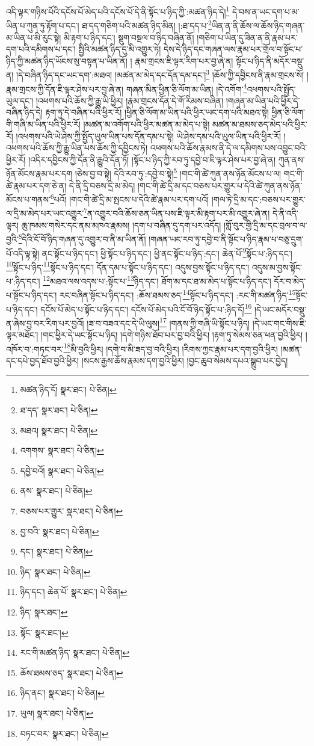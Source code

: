 འདི་ལྟར་གཉིས་པོའི་དངོས་པོ་མེད་པའི་དངོས་པོ་དེ་ནི་སྟོང་པ་ཉིད་ཀྱི་:མཚན་ཉིད་དེ།\footnote{མཚན་ཉིད་དོ།  སྣར་ཐང་།  པེ་ཅིན། } དེ་བས་ན་ཡང་དག་པ་མ་ཡིན་པ་ཀུན་ཏུ་རྟོག་པ་དང་། ཐ་དད་གཅིག་པའི་མཚན་ཉིད་མིན། །:ཐ་དད་པ་\footnote{ཐ་དད་  སྣར་ཐང་།  པེ་ཅིན། }ཡིན་ན་ནི་ཆོས་ལ་ཆོས་ཉིད་གཞན་མ་ཡིན་པ་མི་རུང་སྟེ། མི་རྟག་པ་ཉིད་དང་། སྡུག་བསྔལ་བ་ཉིད་བཞིན་ནོ། །གཅིག་པ་ཡིན་དུ་ཟིན་ན་ནི་རྣམ་པར་དག་པའི་དམིགས་པ་དང་། སྤྱིའི་མཚན་ཉིད་དུ་མི་འགྱུར་ཏེ། དེས་དེ་ཉིད་དང་གཞན་ལས་རྣམ་པར་གྲོལ་བ་སྟོང་པ་ཉིད་ཀྱི་མཚན་ཉིད་ཡོངས་སུ་བསྟན་པ་ཡིན་ནོ། །
རྣམ་གྲངས་ཇི་ལྟར་རིག་པར་བྱ་ཞེ་ན། སྟོང་པ་ཉིད་ནི་མདོར་བསྡུ་ན། །དེ་བཞིན་ཉིད་དང་ཡང་དག་:མཐའ། །མཚན་མ་མེད་དང་དོན་དམ་དང་།\footnote{མཐའ།  སྣར་ཐང་།  པེ་ཅིན། } །ཆོས་ཀྱི་དབྱིངས་ནི་རྣམ་གྲངས་སོ། །རྣམ་གྲངས་ཀྱི་དོན་ཇི་ལྟར་ཤེས་པར་བྱ་ཞེ་ན། གཞན་མིན་ཕྱིན་ཅི་ལོག་མ་ཡིན། །དེ་འགོག་\footnote{འགགས་  སྣར་ཐང་།  པེ་ཅིན། }འཕགས་པའི་སྤྱོད་ཡུལ་དང་། །འཕགས་པའི་ཆོས་ཀྱི་རྒྱུ་ཡི་ཕྱིར། །རྣམ་གྲངས་དོན་དེ་གོ་རིམས་བཞིན། །གཞན་མ་ཡིན་པའི་ཕྱིར་དེ་བཞིན་ཉིད་དེ། རྟག་ཏུ་དེ་བཞིན་པའི་ཕྱིར་རོ། །ཕྱིན་ཅི་ལོག་མ་ཡིན་པའི་ཕྱིར་ཡང་དག་པའི་མཐའ་སྟེ། ཕྱིན་ཅི་ལོག་གི་གཞི་མ་ཡིན་པའི་ཕྱིར་རོ། །མཚན་མ་འགོག་པའི་ཕྱིར་མཚན་མ་མེད་པ་སྟེ། མཚན་མ་ཐམས་ཅད་མེད་པའི་ཕྱིར་རོ། །འཕགས་པའི་ཡེ་ཤེས་ཀྱི་སྤྱོད་ཡུལ་ཡིན་པས་དོན་དམ་པ་སྟེ། ཡེ་ཤེས་དམ་པའི་ཡུལ་ཡིན་པའི་ཕྱིར་རོ། །འཕགས་པའི་ཆོས་ཀྱི་རྒྱུ་ཡིན་པས་ཆོས་ཀྱི་དབྱིངས་ཏེ། འཕགས་པའི་ཆོས་རྣམས་ནི་དེ་ལ་དམིགས་པས་འབྱུང་བའི་ཕྱིར་རོ། །འདིར་དབྱིངས་ཀྱི་དོན་ནི་རྒྱུའི་དོན་ཏོ། །སྟོང་པ་ཉིད་ཀྱི་རབ་ཏུ་དབྱེ་བ་ཇི་ལྟར་ཤེས་པར་བྱ་ཞེ་ན། ཀུན་ནས་ཉོན་མོངས་རྣམ་པར་དག །ཅེས་བྱ་བ་སྟེ། དེའི་རབ་ཏུ་:དབྱེ་བ་སྟེ།\footnote{དབྱེ་བའོ།  སྣར་ཐང་།  པེ་ཅིན། } །གང་གི་ཚེ་ཀུན་ནས་ཉོན་མོངས་པ་ལ། གང་གི་ཚེ་རྣམ་པར་དག་ཅེ་ན། དེ་ནི་དྲི་བཅས་དྲི་མ་མེད། །གང་གི་ཚེ་དྲི་མ་དང་བཅས་པར་གྱུར་པ་དེའི་ཚེ་ཀུན་ནས་ཉོན་མོངས་པ་གནས་\footnote{ནས་  སྣར་ཐང་།  པེ་ཅིན། }པའོ། །གང་གི་ཚེ་དྲི་མ་སྤངས་པ་དེའི་ཚེ་རྣམ་པར་དག་པའོ། །གལ་ཏེ་དྲི་མ་དང་:བཅས་པར་གྱུར་ལ་དྲི་མ་མེད་པར་ཡང་འགྱུར་\footnote{བཅས་པར་གྱུར་  སྣར་ཐང་།  པེ་ཅིན། }ན་འགྱུར་བའི་ཆོས་ཅན་ཡིན་པས་ཇི་ལྟར་མི་རྟག་པར་མི་འགྱུར་ཞེ་ན། དེ་ནི་འདི་ལྟར། ཆུ་ཁམས་གསེར་དང་ནམ་མཁའ་རྣམས། །དག་པ་བཞིན་དུ་དག་པར་འདོད། །གློ་བུར་གྱི་དྲི་མ་དང་བྲལ་བ་ལ་བྱའི་\footnote{བྱ་བའི་  སྣར་ཐང་།  པེ་ཅིན། }དེའི་ངོ་བོ་ཉིད་གཞན་དུ་འགྱུར་བ་ནི་མ་ཡིན་ནོ། །གཞན་ཡང་རབ་ཏུ་དབྱེ་བ་ནི་སྟོང་པ་ཉིད་རྣམ་པ་བཅུ་དྲུག་པོ་འདི་ལྟ་སྟེ། ནང་སྟོང་པ་ཉིད་དང་། ཕྱི་སྟོང་པ་ཉིད་དང་། ཕྱི་ནང་སྟོང་པ་ཉིད་:དང་། ཆེན་པོ་\footnote{དང་།  སྣར་ཐང་།  པེ་ཅིན། }སྟོང་པ་:ཉིད་དང་། \footnote{ཉིད་  སྣར་ཐང་།  པེ་ཅིན། }སྟོང་པ་ཉིད་\footnote{ཉིད་དང་། ཆེན་པོ་  སྣར་ཐང་།  པེ་ཅིན། }སྟོང་པ་ཉིད་དང་། དོན་དམ་པ་སྟོང་པ་ཉིད་དང་། འདུས་བྱས་སྟོང་པ་ཉིད་དང་། འདུས་མ་བྱས་སྟོང་པ་:ཉིད་དང་། \footnote{ཉིད་  སྣར་ཐང་། }མཐའ་ལས་འདས་པ་:སྟོང་པ་\footnote{སྟོང་  སྣར་ཐང་། }ཉིད་དང་། ཐོག་མ་དང་ཐ་མ་མེད་པ་སྟོང་པ་ཉིད་དང་། དོར་བ་མེད་པ་སྟོང་པ་ཉིད་དང་། རང་བཞིན་སྟོང་པ་ཉིད་དང་། :ཆོས་ཐམས་ཅད་\footnote{རང་གི་མཚན་ཉིད་  སྣར་ཐང་།  པེ་ཅིན། }སྟོང་པ་ཉིད་དང་། :རང་གི་མཚན་ཉིད་\footnote{ཆོས་ཐམས་ཅད་  སྣར་ཐང་།  པེ་ཅིན། }སྟོང་པ་ཉིད་དང་། དངོས་པོ་མེད་པ་སྟོང་པ་ཉིད་དང་། དངོས་པོ་མེད་པའི་ངོ་བོ་ཉིད་སྟོང་པ་:ཉིད་དོ།\footnote{ཉིད་ནང་།  སྣར་ཐང་།  པེ་ཅིན། } །དེ་ཡང་མདོར་བསྡུ་ན་ཞེས་བྱ་བར་རིག་པར་བྱའོ། །ཟ་བ་བཟའ་དང་དེ་ཡི་ལུས།\footnote{ཡུལ།  སྣར་ཐང་།  པེ་ཅིན། } །གནས་ཀྱི་གཞི་ཡི་སྟོང་པ་ཉིད། །དེ་ཡང་གང་གིས་ཇི་ལྟར་མཐོང་། །གང་ཕྱིར་དེ་ཡང་སྟོང་པ་ཉིད། །དགེ་གཉིས་ཐོབ་པར་བྱ་བའི་ཕྱིར། །རྟག་ཏུ་སེམས་ཅན་ཕན་བྱའི་ཕྱིར། །འཁོར་བ་:གཏང་བར་\footnote{བཏང་བར་  སྣར་ཐང་།  པེ་ཅིན། }མི་བྱའི་ཕྱིར། །དགེ་བ་མི་ཟད་བྱ་བའི་ཕྱིར། །རིགས་ཀྱང་རྣམ་པར་དག་བྱའི་ཕྱིར། །མཚན་དང་དཔེ་བྱད་ཐོབ་བྱའི་ཕྱིར། །སངས་རྒྱས་ཆོས་རྣམས་དག་བྱའི་ཕྱིར། །བྱང་ཆུབ་སེམས་དཔའ་སྒྲུབ་པར་བྱེད། 